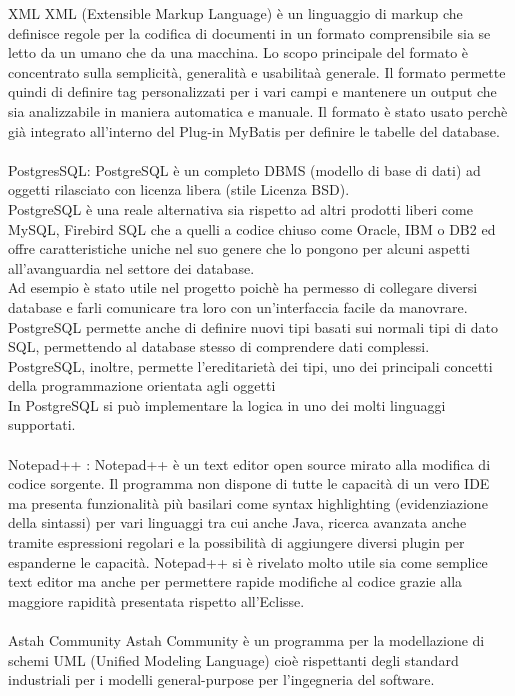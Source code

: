 XML XML (Extensible Markup Language) è un linguaggio di markup che definisce regole per la codifica di documenti in un formato comprensibile sia se letto da un umano che da una macchina. Lo scopo principale del formato è concentrato sulla semplicità, generalità e usabilitaà generale. Il formato permette quindi di definire tag personalizzati per i vari campi e mantenere un output che sia analizzabile in maniera automatica e manuale.
Il formato è stato usato perchè già integrato all'interno del Plug-in MyBatis per definire le tabelle del database.
\\\\
PostgresSQL: 
PostgreSQL è un completo DBMS (modello di base di dati) ad oggetti rilasciato con licenza libera (stile Licenza BSD).\\
PostgreSQL è una reale alternativa sia rispetto ad altri prodotti liberi come MySQL, Firebird SQL che a quelli a codice chiuso come Oracle, IBM o DB2 ed offre caratteristiche uniche nel suo genere che lo pongono per alcuni aspetti all'avanguardia nel settore dei database.\\
Ad esempio è stato utile nel progetto poichè ha permesso di collegare diversi database e farli comunicare tra loro con un’interfaccia facile da manovrare.
PostgreSQL permette anche di definire nuovi tipi basati sui normali tipi di dato SQL, permettendo al database stesso di comprendere dati complessi. \\
PostgreSQL, inoltre, permette l'ereditarietà dei tipi, uno dei principali concetti della programmazione orientata agli oggetti\\
In PostgreSQL si può implementare la logica in uno dei molti linguaggi supportati.
\\\\
Notepad++  : Notepad++ è un text editor open source mirato alla modifica di codice sorgente. Il programma non dispone di tutte le capacità di un vero IDE ma presenta funzionalità più basilari come syntax highlighting (evidenziazione della sintassi) per 
vari linguaggi tra cui anche Java, ricerca avanzata anche tramite espressioni regolari e la possibilità di aggiungere diversi plugin per espanderne le capacità.
Notepad++ si è rivelato molto utile sia come semplice text editor ma anche per permettere rapide modifiche al codice grazie alla maggiore rapidità presentata rispetto all'Eclisse.
\\\\
Astah Community Astah Community è un programma per la modellazione di schemi UML (Unified Modeling Language) cioè rispettanti degli standard industriali per i modelli general-purpose per l’ingegneria del software.
